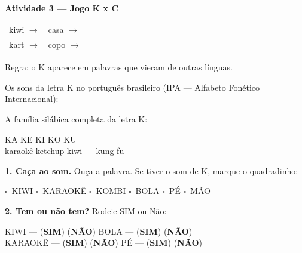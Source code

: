 \begin{consolidacao}
\textbf{Atividade 3 --- Jogo K x C}


\begin{center}
\begin{tabular}{ll}
kiwi \quad $\rightarrow$ \underline{\hspace{2cm}} & casa \quad $\rightarrow$ \underline{\hspace{2cm}} \\
kart \quad $\rightarrow$ \underline{\hspace{2cm}} & copo \quad $\rightarrow$ \underline{\hspace{2cm}}
\end{tabular}
\end{center}
Regra: o K aparece em palavras que vieram de outras l\'inguas.

\end{consolidacao}


\begin{sonsdaletra}
Os sons da letra K no portugu\^es{} brasileiro (IPA --- Alfabeto Fon\'etico Internacional):

\end{sonsdaletra}


\begin{familiasilabica}
A fam\'ilia sil\'abica completa da letra K:

\begin{center}
KA \quad KE \quad KI \quad KO \quad KU \\[0.5em] karaok\^e \quad ketchup \quad kiwi \quad --- \quad kung fu
\end{center}
\end{familiasilabica}


\begin{somletra}
\textbf{1. Ca\c{c}a ao som.} Ou\c{c}a a palavra. Se tiver o som de K, marque o quadradinho:
\begin{center}
$\square$~KIWI \quad $\square$~KARAOK\^E \quad $\square$~KOMBI \quad $\square$~BOLA \quad $\square$~P\'E \quad $\square$~M\~AO
\end{center}

\textbf{2. Tem ou n\~ao{} tem?} Rodeie SIM ou N\~ao:
\begin{center}
KIWI --- (\textbf{SIM}) (\textbf{N\~AO}) \quad BOLA --- (\textbf{SIM}) (\textbf{N\~AO}) \\ KARAOK\^E --- (\textbf{SIM}) (\textbf{N\~AO}) \quad P\'E --- (\textbf{SIM}) (\textbf{N\~AO})
\end{center}
\end{somletra}

